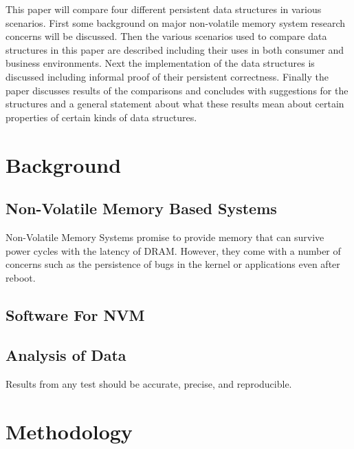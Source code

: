 \documentclass[twocolumn]{article}
\begin{document}
This paper will compare four different persistent data structures in various
scenarios. First some background on major non-volatile memory system research
concerns will be discussed. Then the various scenarios used to compare data
structures in this paper are described including their uses in both consumer and
business environments. Next the implementation of the data structures is
discussed including informal proof of their persistent correctness. Finally the
paper discusses results of the comparisons and concludes with suggestions for
the structures and a general statement about what these results mean about
certain properties of certain kinds of data structures.

\section{Background}

\subsection{Non-Volatile Memory Based Systems}

Non-Volatile Memory Systems promise to provide memory that can survive power
cycles with the latency of DRAM. 
However, they come with a number of concerns such as the persistence of bugs in
the kernel or applications even after reboot.

\subsection{Software For NVM}


\subsection{Analysis of Data}

Results from any test should be accurate, precise, and reproducible.

\section{Methodology}

\end{document}
